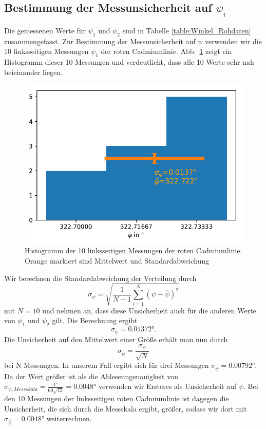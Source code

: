\documentclass[12pt,a4paper]{article}
\begin{document}
\subsection{Bestimmung der Messunsicherheit auf  $\psi_i$}
Die gemessenen Werte für $\psi_{1}$ und $\psi_2$ sind in Tabelle \ref{table:Winkel_Rohdaten} zusammengefasst. Zur Bestimmung der Messunsicherheit auf $\psi$ verwenden wir die 10 linksseitigen Messungen $\psi_1$ der roten Cadmiumlinie. Abb.~\ref{Histogramm} zeigt ein Histogramm dieser 10 Messungen und verdeutlicht, dass alle 10 Werte sehr nah beieinander liegen.
\begin{figure}[H]
	\centering
	\includegraphics[width=0.6\linewidth]{Python/Histogramm_Psi.pdf}
	\caption{Histogramm der 10 linksseitigen Messungen der roten Cadmiumlinie. Orange markiert sind Mittelwert und Standardabweichung}
	\label{Histogramm}
\end{figure}
Wir berechnen die Standardabweichung der Verteilung durch
\begin{equation}
\sigma_{\psi}=\sqrt{\frac{1}{N-1}\sum^{N}_{i=1}{(\psi-\overline{\psi})^2}}
\end{equation}
mit $N=10$ und nehmen an, dass diese Unsicherheit auch für die anderen Werte von $\psi_1$ und $\psi_2$ gilt. Die Berechnung ergibt
\begin{equation}
\sigma_{\psi}=\ang{0.01372}.
\end{equation}
Die Unsicherheit auf den Mittelwert einer Größe erhält man nun durch
\begin{equation}
\sigma_{\overline{\psi}}=\frac{\sigma_{\psi}}{\sqrt{N}}
\end{equation}
bei N Messungen.  In unserem Fall ergibt sich für drei Messungen $\sigma_{\overline{\psi}}=\ang{0.00792}$. Da der Wert größer ist als die Ableseungenauigkeit von $\sigma_{\psi, Messskala}=\frac{\ang{1}}{60\sqrt{12}}=\ang{0.0048}$ verwenden wir Ersteres als Unsicherheit auf $\overline{\psi}$. Bei den 10 Messungen der linksseitigen roten Cadmiumlinie ist dagegen die Unsicherheit, die sich durch die Messskala ergibt, größer, sodass wir dort mit $\sigma_{\overline{\psi}}=\ang{0.0048}$ weiterrechnen.
\end{document}
